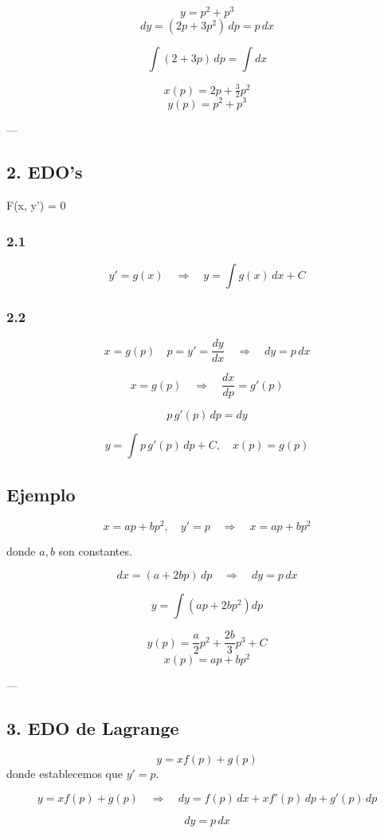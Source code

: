 \documentclass[a4paper,12pt]{article}
\begin{document}
\[
y = p^2 + p^3
\]
\[
dy = (2p + 3p^2)\, dp = p\, dx
\]

\[
\int (2 + 3p)\, dp = \int dx
\]

\[
x(p) = 2p + \tfrac{3}{2} p^2
\]
\[
y(p) = p^2 + p^3
\]

---

\subsection*{2. EDO's } F(x, y') = 0

\subsubsection*{2.1}
\[
y' = g(x) \quad \Rightarrow \quad y = \int g(x)\, dx + C
\]

\subsubsection*{2.2}
\[
x = g(p) \quad p = y' = \frac{dy}{dx} \quad \Rightarrow \quad dy = p\, dx
\]

\[
x = g(p) \quad \Rightarrow \quad \frac{dx}{dp} = g'(p)
\]

\[
p\, g'(p)\, dp = dy
\]

\[
y = \int p\, g'(p)\, dp + C, \quad x(p) = g(p)
\]
\subsection*{Ejemplo}

\[
x = ap + b p^2, \quad y' = p \quad \Rightarrow \quad x = ap + bp^2
\]

donde \(a, b\) son constantes.

\[
dx = (a + 2bp)\, dp \quad \Rightarrow \quad dy = p\, dx
\]

\[
y = \int (ap + 2bp^2) dp
\]

\[
y(p) = \frac{a}{2} p^2 + \frac{2b}{3} p^3 + C
\]
\[
x(p) = ap + bp^2
\]

---

\subsection*{3. EDO de Lagrange}

\[
y = x f(p) + g(p)
\]
donde establecemos que \(y' = p\).

\[
y = x f(p) + g(p) \quad \Rightarrow \quad dy = f(p)\, dx + x f'(p)\, dp + g'(p)\, dp
\]

\[
dy = p\, dx
\]
\end{document}
